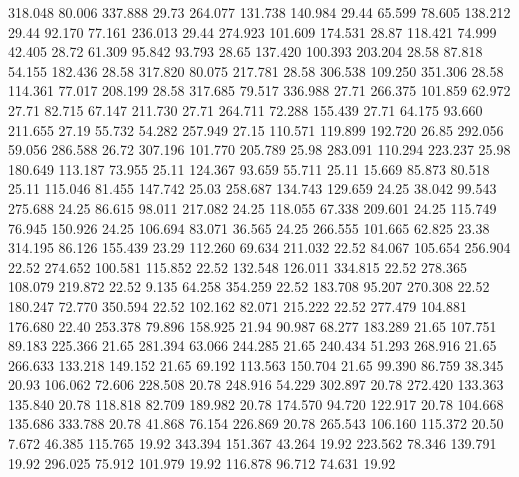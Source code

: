  318.048   80.006  337.888        29.73
 264.077  131.738  140.984        29.44
  65.599   78.605  138.212        29.44
  92.170   77.161  236.013        29.44
 274.923  101.609  174.531        28.87
 118.421   74.999   42.405        28.72
  61.309   95.842   93.793        28.65
 137.420  100.393  203.204        28.58
  87.818   54.155  182.436        28.58
 317.820   80.075  217.781        28.58
 306.538  109.250  351.306        28.58
 114.361   77.017  208.199        28.58
 317.685   79.517  336.988        27.71
 266.375  101.859   62.972        27.71
  82.715   67.147  211.730        27.71
 264.711   72.288  155.439        27.71
  64.175   93.660  211.655        27.19
  55.732   54.282  257.949        27.15
 110.571  119.899  192.720        26.85
 292.056   59.056  286.588        26.72
 307.196  101.770  205.789        25.98
 283.091  110.294  223.237        25.98
 180.649  113.187   73.955        25.11
 124.367   93.659   55.711        25.11
  15.669   85.873   80.518        25.11
 115.046   81.455  147.742        25.03
 258.687  134.743  129.659        24.25
  38.042   99.543  275.688        24.25
  86.615   98.011  217.082        24.25
 118.055   67.338  209.601        24.25
 115.749   76.945  150.926        24.25
 106.694   83.071   36.565        24.25
 266.555  101.665   62.825        23.38
 314.195   86.126  155.439        23.29
 112.260   69.634  211.032        22.52
  84.067  105.654  256.904        22.52
 274.652  100.581  115.852        22.52
 132.548  126.011  334.815        22.52
 278.365  108.079  219.872        22.52
   9.135   64.258  354.259        22.52
 183.708   95.207  270.308        22.52
 180.247   72.770  350.594        22.52
 102.162   82.071  215.222        22.52
 277.479  104.881  176.680        22.40
 253.378   79.896  158.925        21.94
  90.987   68.277  183.289        21.65
 107.751   89.183  225.366        21.65
 281.394   63.066  244.285        21.65
 240.434   51.293  268.916        21.65
 266.633  133.218  149.152        21.65
  69.192  113.563  150.704        21.65
  99.390   86.759   38.345        20.93
 106.062   72.606  228.508        20.78
 248.916   54.229  302.897        20.78
 272.420  133.363  135.840        20.78
 118.818   82.709  189.982        20.78
 174.570   94.720  122.917        20.78
 104.668  135.686  333.788        20.78
  41.868   76.154  226.869        20.78
 265.543  106.160  115.372        20.50
   7.672   46.385  115.765        19.92
 343.394  151.367   43.264        19.92
 223.562   78.346  139.791        19.92
 296.025   75.912  101.979        19.92
 116.878   96.712   74.631        19.92
